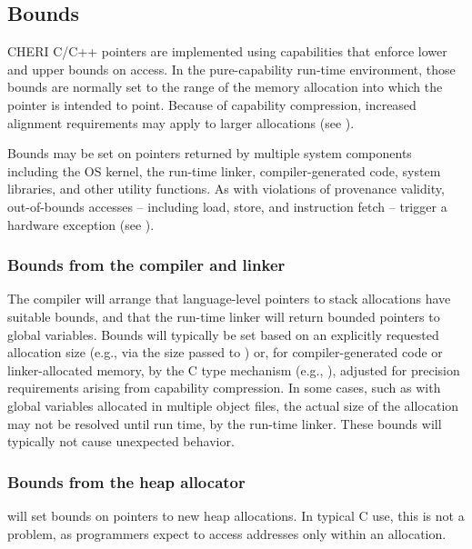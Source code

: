 \documentclass[12pt,twoside,openright,a4paper]{article}
\newcommand{\ccode}[1]{{\small\ttfamily{#1}}}
\newcommand{\cfunc}[1]{{\ccode{#1()}}}
\begin{document}
\subsection{Bounds}

CHERI C/C++ pointers are implemented using capabilities that enforce lower and
upper bounds on access.
In the pure-capability run-time environment, those bounds are normally set to
the range of the memory allocation into which the pointer is intended to
point.
Because of capability compression, increased alignment requirements may apply
to larger allocations (see ).

Bounds may be set on pointers returned by multiple system components including
the OS kernel, the run-time linker, compiler-generated code, system libraries,
and other utility functions.
As with violations of provenance validity, out-of-bounds accesses -- including
load, store, and instruction fetch -- trigger a hardware exception (see
).

\subsubsection{Bounds from the compiler and linker}

The compiler will arrange that language-level pointers to stack allocations have suitable
bounds, and that the run-time linker will return bounded pointers to global
variables.
Bounds will typically be set based on an explicitly requested allocation size
(e.g., via the size passed to \cfunc{alloca}) or, for compiler-generated
code or linker-allocated memory, by the C type mechanism (e.g.,
\ccode{sizeof(foo)}), adjusted for precision requirements arising from
capability compression.
In some cases, such as with global variables allocated in multiple object
files, the actual size of the allocation may not be resolved until run time,
by the run-time linker.
These bounds will typically not cause unexpected behavior.

\subsubsection{Bounds from the heap allocator}

\cfunc{malloc} will set bounds on pointers to new heap allocations.
In typical C use, this is not a problem, as programmers expect to access
addresses only within an allocation.
\end{document}
